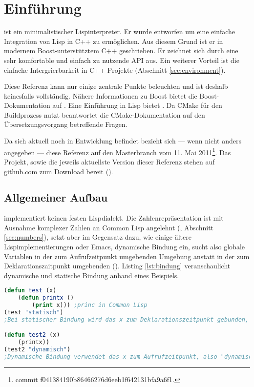 \section{Einführung}
\label{sec:einfuehrung}

\projectname{} ist ein minimalistischer Lispinterpreter. Er wurde entworfen um eine einfache
Integration von Lisp in C++ zu ermöglichen. Aus diesem Grund ist er in modernem Boost-unterstütztem
C++ geschrieben. Er zeichnet sich durch eine sehr komfortable und einfach zu nutzende API aus.
Ein weiterer Vorteil ist die einfache Intergrierbarkeit in C++-Projekte (Abschnitt \ref{sec:environment}).

Diese Referenz kann nur einige zentrale Punkte beleuchten und ist deshalb keinesfalls vollständig. Nähere Informationen zu Boost bietet die Boost-Do\-ku\-men\-ta\-tion auf \cite{smart_ptr_online}. Eine Einführung in Lisp bietet \cite{graham_ansi_1995}. Da \projectname{} CMake für den Buildprozess nutzt beantwortet die CMake-Dokumentation auf \cite{cmake_online} den Übersetzungsvorgang betreffende Fragen.

Da sich \projectname{} aktuell noch in Entwicklung befindet bezieht sich --- wenn nicht anders angegeben --- diese Referenz auf den Masterbranch vom 11. Mai 2011\footnote{commit f041384190b86466276d6eeb1f642131bfa9a6f1.}.
Das Projekt, sowie die jeweils aktuellste Version dieser Referenz stehen auf github.com zum Download bereit (\cite{lisp_interaction_online}\cite{lisp_interaction_ref_online}). %

\subsection{Allgemeiner Aufbau}


\projectname{} implementiert keinen festen Lispdialekt. Die Zahlenrepräsentation ist mit Ausnahme komplexer Zahlen an Common Lisp angelehnt (\cite[S. 143ff]{graham_ansi_1995}, Abschnitt \ref{sec:numbers}), setzt aber im Gegensatz dazu, wie einige ältere Lispimplementierungen oder Emacs, dynamische Bindung ein, sucht also globale Variablen in der zum Aufrufzeitpunkt umgebenden Umgebung anstatt in der zum Deklarationszaitpunkt umgebenden (\cite[36, 63]{wilhelm_uebersetzerbau_2007}\cite[112]{graham_ansi_1995}). Listing \ref{lst:bindung} veranschaulicht dynamische und statische Bindung anhand eines Beispiels.

\begin{lstlisting}[caption={dynamische Bindung}, label=lst:bindung, language=Lisp]
(defun test (x)
    (defun printx ()
        (print x))) ;princ in Common Lisp
(test "statisch")
;Bei statischer Bindung wird das x zum Deklarationszeitpunkt gebunden, also "statisch"

(defun test2 (x)
    (printx))
(test2 "dynamisch")
;Dynamische Bindung verwendet das x zum Aufrufzeitpunkt, also "dynamisch"
\end{lstlisting}

